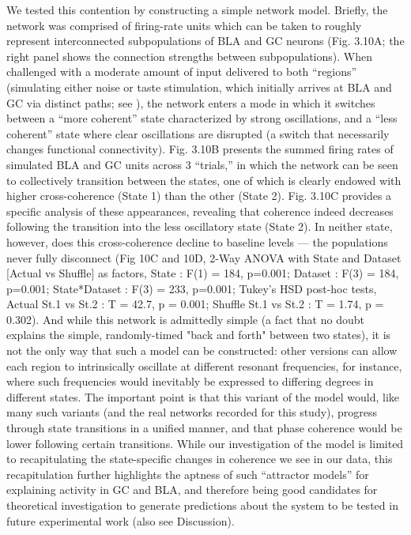\begin{refsection}
We tested this contention by constructing a simple network model. Briefly, the network was comprised of firing-rate units which can be taken to roughly represent interconnected subpopulations of BLA and GC neurons (Fig. 3.10A; the right panel shows the connection strengths between subpopulations). When challenged with a moderate amount of input delivered to both “regions” (simulating either noise or taste stimulation, which initially arrives at BLA and GC via distinct paths; see \cite{gal-ben-ari2012a}), the network enters a mode in which it switches between a “more coherent” state characterized by strong oscillations, and a “less coherent” state where clear oscillations are disrupted (a switch that necessarily changes functional connectivity). Fig. 3.10B presents the summed firing rates of simulated BLA and GC units across 3 “trials,” in which the network can be seen to collectively transition between the states, one of which is clearly endowed with higher cross-coherence (State 1) than the other (State 2).
Fig. 3.10C provides a specific analysis of these appearances, revealing that coherence indeed decreases following the transition into the less oscillatory state (State 2). In neither state, however, does this cross-coherence decline to baseline levels --- the populations never fully disconnect (Fig 10C and 10D, 2-Way ANOVA with State and Dataset [Actual vs Shuffle] as factors, State : F(1) = 184, p=0.001; Dataset : F(3) = 184, p=0.001; State*Dataset : F(3) = 233, p=0.001; Tukey’s HSD post-hoc tests, Actual St.1 vs St.2 : T = 42.7, p = 0.001; Shuffle St.1 vs St.2 : T = 1.74, p = 0.302). And while this network is admittedly simple (a fact that no doubt explains the simple, randomly-timed "back and forth" between two states), it is not the only way that such a model can be constructed: other versions can allow each region to intrinsically oscillate at different resonant frequencies, for instance, where such frequencies would inevitably be expressed to differing degrees in different states. The important point is that this variant of the model would, like many such variants (and the real networks recorded for this study), progress through state transitions in a unified manner, and that phase coherence would be lower following certain transitions. While our investigation of the model is limited to recapitulating the state-specific changes in coherence we see in our data, this recapitulation further highlights the aptness of such “attractor models” for explaining activity in GC and BLA, and therefore being good candidates for theoretical investigation to generate predictions about the system to be tested in future experimental work (also see Discussion).


\end{refsection}
